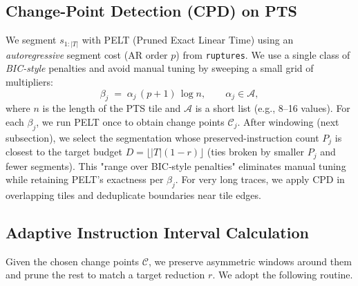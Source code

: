 \subsection{Change-Point Detection (CPD) on PTS}
\label{subsec:cpd}
We segment \(s_{1:|T|}\) with PELT (Pruned Exact Linear Time) using an \emph{autoregressive} segment cost (AR order \(p\)) from \texttt{ruptures}. We use a single class of \emph{BIC-style} penalties and avoid manual tuning by sweeping a small grid of multipliers:
\[
\beta_j \;=\; \alpha_j\,(p{+}1)\,\log n, \qquad \alpha_j \in \mathcal{A},
\]
where \(n\) is the length of the PTS tile and \(\mathcal{A}\) is a short list (e.g., 8–16 values). For each \(\beta_j\), we run PELT once to obtain change points \(\mathcal{C}_j\). After windowing (next subsection), we select the segmentation whose preserved-instruction count \(P_j\) is closest to the target budget \(D=\lfloor|T|(1-r)\rfloor\) (ties broken by smaller \(P_j\) and fewer segments). This "range over BIC‑style penalties" eliminates manual tuning while retaining PELT’s exactness per \(\beta_j\). For very long traces, we apply CPD in overlapping tiles and deduplicate boundaries near tile edges.

\subsection{Adaptive Instruction Interval Calculation}
\label{instr_removal}
Given the chosen change points \(\mathcal{C}\), we preserve asymmetric windows around them and prune the rest to match a target reduction \(r\). We adopt the following routine.

